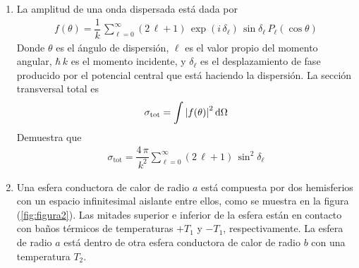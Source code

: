 \begin{enumerate}
\item La amplitud de una onda dispersada está dada por
\begin{align*}
f(\theta) = \dfrac{1}{k} \, \sum_{\ell = 0}^{\infty} (2 \, \ell + 1) \, \exp(i \, \delta_{\ell}) \, \sin \delta_{\ell} \, P_{\ell} (\cos \theta)
\end{align*}
Donde $\theta$ es el ángulo de dispersión, $\ell$ es el valor propio del momento angular, $\hbar \, k$ es el momento incidente, y $\delta_{\ell}$ es el desplazamiento de fase producido por el potencial central que está haciendo la dispersión. La sección transversal total es 
\begin{align*}
\sigma_{\text{tot}} = \int \abs{f(\theta)}^{2} \dd{\Omega}
\end{align*}
Demuestra que
\begin{align*}
\sigma_{\text{tot}} = \dfrac{4 \, \pi}{k^{2}} \sum_{\ell=0}^{\infty} (2 \, \ell + 1) \, \sin^{2} \delta_{\ell}
\end{align*}
\item Una esfera conductora de calor de radio $a$ está compuesta por dos hemisferios con un espacio infinitesimal aislante entre ellos, como se muestra en la figura (\ref{fig:figura2}). Las mitades superior e inferior de la esfera están en contacto con baños térmicos de temperaturas $+ T_{1}$ y $-T_{1}$, respectivamente. La esfera de radio $a$ está dentro de otra esfera conductora de calor de radio $b$ con una temperatura $T_{2}$.


\end{enumerate}
